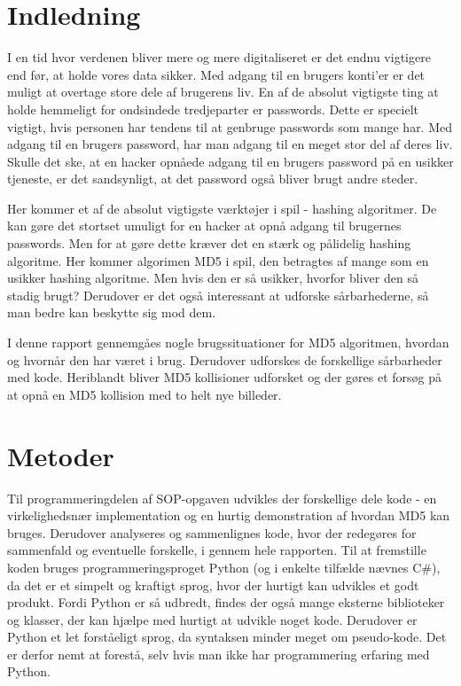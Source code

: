 \documentclass[12pt]{article}
\begin{document}
\newpage



\renewcommand\cftsecfont{\large}
\renewcommand\cftsecpagefont{\large}
\renewcommand\cftsecafterpnum{\par\addvspace{7pt}}
\tableofcontents

\newpage
\section{Indledning}
I en tid hvor verdenen bliver mere og mere digitaliseret er det endnu vigtigere end før, at holde vores data sikker. Med adgang til en brugers konti'er er det muligt at overtage store dele af brugerens liv. En af de absolut vigtigste ting at holde hemmeligt for ondsindede tredjeparter er passwords. Dette er specielt vigtigt, hvis personen har tendens til at genbruge passwords som mange har. Med adgang til en brugers password, har man adgang til en meget stor del af deres liv. Skulle det ske, at en hacker opnåede adgang til en brugers password på en usikker tjeneste, er det sandsynligt, at det password også bliver brugt andre steder. 

Her kommer et af de absolut vigtigste værktøjer i spil - hashing algoritmer. De kan gøre det stortset umuligt for en hacker at opnå adgang til brugernes passwords. Men for at gøre dette kræver det en stærk og pålidelig hashing algoritme. Her kommer algorimen MD5 i spil, den betragtes af mange som en usikker hashing algoritme. Men hvis den er så usikker, hvorfor bliver den så stadig brugt? Derudover er det også interessant at udforske sårbarhederne, så man bedre kan beskytte sig mod dem. 

I denne rapport gennemgåes nogle brugssituationer for MD5 algoritmen, hvordan og hvornår den har været i brug. Derudover udforskes de forskellige sårbarheder med kode. Heriblandt bliver MD5 kollisioner udforsket og der gøres et forsøg på at opnå en MD5 kollision med to helt nye billeder. 




\section{Metoder}
Til programmeringdelen af SOP-opgaven udvikles der forskellige dele kode - en virkelighedsnær implementation og en hurtig demonstration af hvordan MD5 kan bruges. Derudover analyseres og sammenlignes kode, hvor der redegøres for sammenfald og eventuelle forskelle, i gennem hele rapporten. Til at fremstille koden bruges programmeringsproget Python (og i enkelte tilfælde nævnes C\#), da det er et simpelt og kraftigt sprog, hvor der hurtigt kan udvikles et godt produkt. Fordi Python er så udbredt, findes der også mange eksterne  biblioteker og klasser, der kan hjælpe med hurtigt at udvikle noget kode. Derudover er Python et let forståeligt sprog, da syntaksen minder meget om pseudo-kode. Det er derfor nemt at forestå, selv hvis man ikke har programmering erfaring med Python.     
\end{document}
